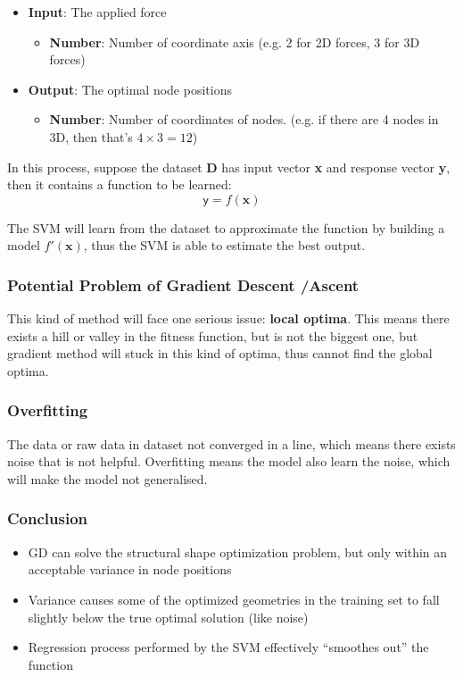 \documentclass[a4paper, openany]{book}
\begin{document}
\begin{itemize}
  \item \textbf{Input}: The applied force
  \begin{itemize}
    \item \textbf{Number}: Number of coordinate axis (e.g. 2 for 2D forces, 3 for 3D forces)
  \end{itemize}
  \item \textbf{Output}: The optimal node positions
  \begin{itemize}
    \item \textbf{Number}: Number of coordinates of nodes. (e.g. if there are 4 nodes in 3D, then that's $4 \times 3 = 12$)
  \end{itemize}
\end{itemize}

In this process, suppose the dataset \textbf{D} has input vector \textbf{x} and response vector \textbf{y}, then it contains a function to be learned:
$$\mathsf{y} = f(\mathbf{x})$$

The SVM will learn from the dataset to approximate the function by building a model $f'(\mathbf{x})$, thus the SVM is able to estimate the best output.

\subsubsection{Potential Problem of Gradient Descent \slash Ascent}

This kind of method will face one serious issue: \textbf{local optima}. This means there exists a hill or valley in the fitness function, but is not the biggest one, but gradient method will stuck in this kind of optima, thus cannot find the global optima.

\subsubsection{Overfitting}

The data or raw data in dataset not converged in a line, which means there exists noise that is not helpful. Overfitting means the model also learn the noise, which will make the model not generalised.

\subsubsection{Conclusion}

\begin{itemize}
  \item GD can solve the structural shape optimization problem, but only within an acceptable variance in node positions
  \item Variance causes some of the optimized geometries in the training set to fall slightly below the true optimal solution (like noise)
  \item Regression process performed by the SVM effectively ``smoothes out'' the function
\end{itemize}
\end{document}
